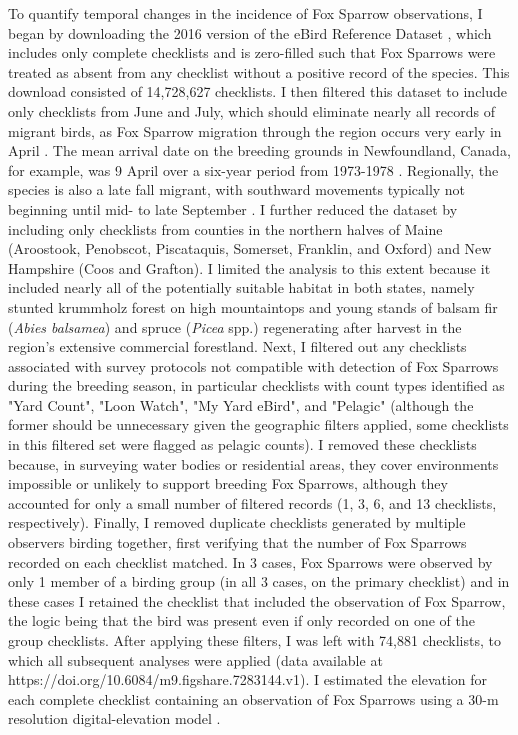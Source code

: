 \documentclass[fleqn,10pt,lineno]{wlpeerj} %
\begin{document}
To quantify temporal changes in the incidence of Fox Sparrow observations, I began by downloading the 2016 version of the eBird Reference Dataset \citep{Fink2017-om}, which includes only complete checklists and is zero-filled such that Fox Sparrows were treated as absent from any checklist without a positive record of the species. This download consisted of 14,728,627 checklists. I then filtered this dataset to include only checklists from June and July, which should eliminate nearly all records of migrant birds, as Fox Sparrow migration through the region occurs very early in April \citep{Weckstein2002-px}. The mean arrival date on the breeding grounds in Newfoundland, Canada, for example, was 9 April over a six-year period from 1973-1978 \citep{Threlfall1982-wd}. Regionally, the species is also a late fall migrant, with southward movements typically not beginning until mid- to late September \citep{Weckstein2002-px}. I further reduced the dataset by including only checklists from counties in the northern halves of Maine (Aroostook, Penobscot, Piscataquis, Somerset, Franklin, and Oxford) and New Hampshire (Coos and Grafton). I limited the analysis to this extent because it included nearly all of the potentially suitable habitat in both states, namely stunted krummholz forest on high mountaintops and young stands of balsam fir (\textit{Abies balsamea}) and spruce (\textit{Picea} spp.) regenerating after harvest in the region’s extensive commercial forestland. Next, I filtered out any checklists associated with survey protocols not compatible with detection of Fox Sparrows during the breeding season, in particular checklists with count types identified as "Yard Count", "Loon Watch", "My Yard eBird", and "Pelagic" (although the former should be unnecessary given the geographic filters applied, some checklists in this filtered set were flagged as pelagic counts). I removed these checklists because, in surveying water bodies or residential areas, they cover environments impossible or unlikely to support breeding Fox Sparrows, although they accounted for only a small number of filtered records (1, 3, 6, and 13 checklists, respectively). Finally, I removed duplicate checklists generated by multiple observers birding together, first verifying that the number of Fox Sparrows recorded on each checklist matched. In 3 cases, Fox Sparrows were observed by only 1 member of a birding group (in all 3 cases, on the primary checklist) and in these cases I retained the checklist that included the observation of Fox Sparrow, the logic being that the bird was present even if only recorded on one of the group checklists. After applying these filters, I was left with 74,881 checklists, to which all subsequent analyses were applied (data available at https://doi.org/10.6084/m9.figshare.7283144.v1). I estimated the elevation for each complete checklist containing an observation of Fox Sparrows using a 30-m resolution digital-elevation model \citep{farr2007shuttle}.
\end{document}
